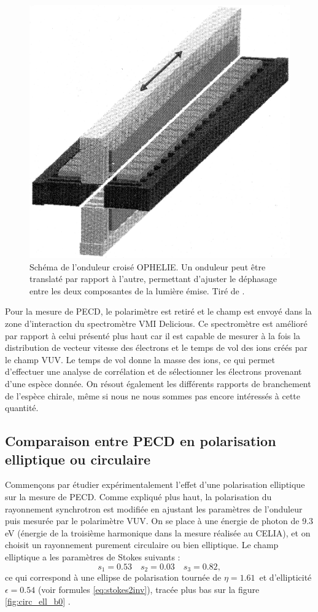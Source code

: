 \begin{figure}[!ht]
\centering
\includegraphics[width=0.4\columnwidth]{Figures/Soleil/onduleur.jpg}%
\caption{Schéma de l'onduleur croisé OPHELIE. Un onduleur peut être translaté par rapport à l'autre, permettant d'ajuster le déphasage entre les deux composantes de la lumière émise. Tiré de .}
\label{fig:onduleur}
\end{figure}

Pour la mesure de PECD, le polarimètre est retiré et le champ est envoyé dans la zone d'interaction du spectromètre VMI Delicious. Ce spectromètre est amélioré par rapport à celui présenté plus haut car il est capable de mesurer à la fois la distribution de vecteur vitesse des électrons et le temps de vol des ions créés par le champ VUV. Le temps de vol donne la masse des ions, ce qui permet d'effectuer une analyse de corrélation et de sélectionner les électrons provenant d'une espèce donnée. On résout également les différents rapports de branchement de l'espèce chirale, même si nous ne nous sommes pas encore intéressés à cette quantité.

\subsection{Comparaison entre PECD en polarisation elliptique ou circulaire}
Commençons par étudier expérimentalement l'effet d'une polarisation elliptique sur la mesure de PECD. Comme expliqué plus haut, la polarisation du rayonnement synchrotron est modifiée en ajustant les paramètres de l'onduleur puis mesurée par le polarimètre VUV. On se place à une énergie de photon de 9.3 eV (énergie de la troisième harmonique dans la mesure réalisée au CELIA), et on choisit un rayonnement purement circulaire ou bien elliptique. Le champ elliptique a les paramètres de Stokes suivants :
\[ s_1=0.53\quad s_2=0.03\quad s_3=0.82, \]
ce qui correspond à une ellipse de polarisation tournée de $\eta=1.61$\degres~et d'ellipticité $\epsilon = 0.54$ (voir formules \ref{eq:stokes2inv}), tracée plus bas sur la figure \ref{fig:circ_ell_b0} .
 
